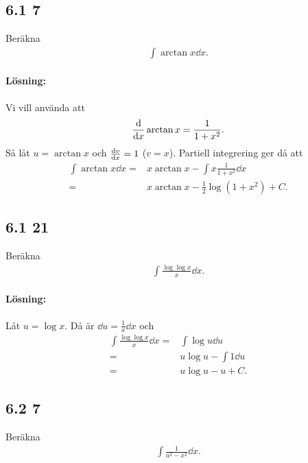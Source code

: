 \subsection{6.1 7}%
\label{sub:6_1_7}

Beräkna
\begin{align*}
	\int \arctan x \dd{x}.
\end{align*}

\paragraph{Lösning:}

Vi vill använda att
\begin{align*}
	\derivative{}{x} \arctan{x} = \frac{1}{1 + x^2}.
\end{align*}
Så låt $u = \arctan{x}$ och $\derivative{v}{x} = 1$ ($v = x$).
Partiell integrering ger då att
\begin{align*}
	\int \arctan x \dd{x} ={}& x \arctan{x} - \int x \frac{1}{1 + x^2} \dd{x}\\
	={}& x \arctan{x} - \frac{1}{2} \log{(1 + x^2)} + C.
\end{align*}


\subsection{6.1 21}%
\label{sub:6_1_21}

Beräkna
\begin{align*}
	\int \frac{\log{\log{x}}}{x} \dd{x}.
\end{align*}


\paragraph{Lösning:}

Låt $u = \log{x}$.
Då är $\dd{u} = \frac{1}{x} \dd{x}$ och
\begin{align*}
	\int \frac{\log{\log{x}}}{x} \dd{x} ={}& \int \log{u} \dd{u}\\
	={}& u \log{u} - \int 1 \dd{u}\\
	={}& u \log{u} - u + C.
\end{align*}


\subsection{6.2 7}%
\label{sub:6_2_7}

Beräkna
\begin{align*}
	\int \frac{1}{a^2 - x^2} \dd{x}.
\end{align*}

